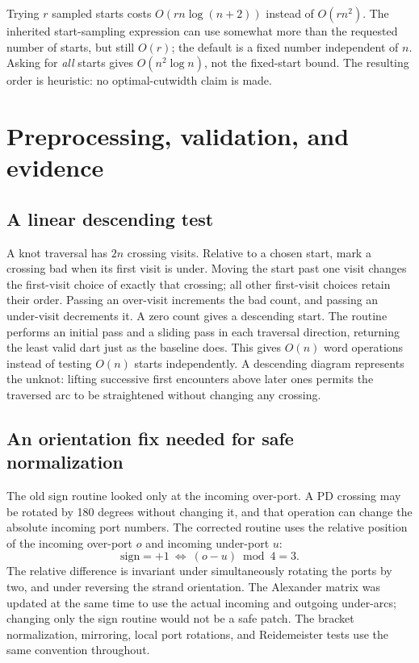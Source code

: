 \documentclass[11pt,a4paper]{article}
\theoremstyle{definition}\newtheorem{remark}[theorem]{Remark}
\begin{document}
Trying $r$ sampled starts costs $O(rn\log(n+2))$ instead of $O(rn^2)$.
The inherited start-sampling expression can use somewhat more than the requested
number of starts, but still $O(r)$; the default is a fixed number independent of
$n$. Asking for \emph{all} starts gives $O(n^2\log n)$, not the fixed-start bound.
The resulting order is heuristic: no optimal-cutwidth claim is made.

\section{Preprocessing, validation, and evidence}
\label{sec:safety}
\subsection{A linear descending test}
A knot traversal has $2n$ crossing visits. Relative to a chosen start, mark a
crossing bad when its first visit is under. Moving the start past one visit
changes the first-visit choice of exactly that crossing; all other first-visit
choices retain their order. Passing an over-visit increments the bad count,
and passing an under-visit decrements it. A zero count gives a descending start.
The routine performs an initial pass and a sliding pass in each traversal
direction, returning the least valid dart just as the baseline does. This gives
$O(n)$ word operations instead of testing $O(n)$ starts independently. A
descending diagram represents the unknot: lifting successive first encounters
above later ones permits the traversed arc to be straightened without changing
any crossing.

\subsection{An orientation fix needed for safe normalization}
The old sign routine looked only at the incoming over-port. A PD crossing may be
rotated by 180 degrees without changing it, and that operation can change the
absolute incoming port numbers. The corrected routine uses the relative
position of the incoming over-port $o$ and incoming under-port $u$:
\[
\text{sign}=+1\ \Longleftrightarrow\ (o-u)\bmod4=3.
\]
The relative difference is invariant under simultaneously rotating the ports by
two, and under reversing the strand orientation. The Alexander matrix was
updated at the same time to use the actual incoming and outgoing under-arcs;
changing only the sign routine would not be a safe patch. The bracket
normalization, mirroring, local port rotations, and Reidemeister tests use the
same convention throughout.
\end{document}
